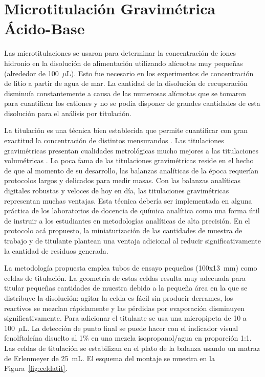 \chapter{Microtitulación Gravimétrica Ácido-Base}\label{Sec:microfuck}
Las microtitulaciones se usaron para determinar la concentración de iones hidronio en la disolución de alimentación utilizando alícuotas muy pequeñas (alrededor de 100~$\mu$L). Esto fue necesario en los experimentos de concentración de litio a partir de agua de mar. La cantidad de la disolución de recuperación disminuía constantemente a causa de las numerosas alícuotas que se tomaron para cuantificar los cationes y no se podía disponer de grandes cantidades de esta disolución para el análisis por titulación. 

La titulación es una técnica bien establecida que permite cuantificar con gran exactitud la concentración de distintos mensurandos \citep{Skoog2013}. Las titulaciones gravimétricas presentan cualidades metrológicas mucho mejores a las titulaciones volumétricas \citep{Ahumada2018}. La poca fama de las titulaciones gravimétricas reside en el hecho de que al momento de su desarrollo, las balanzas analíticas de la época requerían protocolos largos y delicados para medir masas. Con las balanzas analíticas digitales robustas y veloces de hoy en día, las titulaciones gravimétricas representan muchas ventajas. Esta técnica debería ser implementada en alguna práctica de los laboratorios de docencia de química analítica como una forma útil de instruir a los estudiantes en metodologías analíticas de alta precisión. En el protocolo acá propuesto, la miniaturización de las cantidades de muestra de trabajo y de titulante plantean una ventaja adicional al reducir significativamente la cantidad de residuos generada.


La metodología propuesta emplea tubos de ensayo pequeños (100x13~mm) como celdas de titulación. La geometría de estas celdas resulta muy adecuada para titular pequeñas cantidades de muestra debido a la pequeña área en la que se distribuye la disolución: agitar la celda es fácil sin producir derrames, los reactivos se mezclan rápidamente y las pérdidas por evaporación disminuyen significativamente. %
Para adicionar el titulante se usa una micropipeta de 10 a 100~$\mu$L. La detección de punto final se puede hacer con el indicador visual fenolftaleína disuelto al 1\% en una mezcla isopropanol/agua en proporción 1:1. Las celdas de titulación se estabilizan en el plato de la balanza usando un matraz de Erlenmeyer de 25~mL. El esquema del montaje se muestra en la Figura~\ref{fig:celdatit}.

